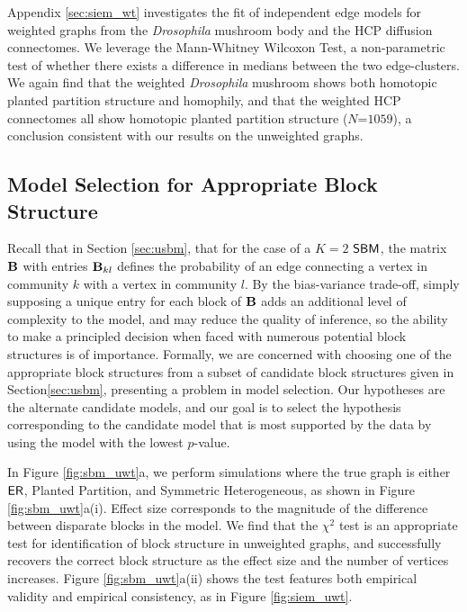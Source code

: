 Appendix \ref{sec:siem_wt} investigates the fit of independent edge models for weighted graphs from the \textit{Drosophila} mushroom body and the HCP diffusion connectomes. We leverage the Mann-Whitney Wilcoxon Test, a non-parametric test of whether there exists a difference in medians between the two edge-clusters. We again find that the weighted \textit{Drosophila} mushroom shows both homotopic planted partition structure and homophily, and that the weighted HCP connectomes all show homotopic planted partition structure ($N$=$1059$), a conclusion consistent with our results on the unweighted graphs. 

\subsection{Model Selection for Appropriate Block Structure}
\label{sec:sbm_block_est}

Recall that in Section \ref{sec:usbm}, that for the case of a $K=2$ $\operatorname{\mathsf{SBM}}$, the matrix $\operatorname{\mathbf{B}}$ with entries $\operatorname{\mathbf{B}}_{kl}$ defines the probability of an edge connecting a vertex in community $k$ with a vertex in community $l$. By the bias-variance trade-off, simply supposing a unique entry for each block of $\operatorname{\mathbf{B}}$ adds an additional level of complexity to the model, and may reduce the quality of inference, so the ability to make a principled decision when faced with numerous potential block structures is of importance. Formally, we are concerned with choosing one of the appropriate block structures from a subset of candidate block structures given in Section\ref{sec:usbm}, presenting a problem in model selection. Our hypotheses are the alternate candidate models, and our goal is to select the hypothesis corresponding to the candidate model that is most supported by the data by using the model with the lowest $p$-value.

In Figure \ref{fig:sbm_uwt}a, we perform simulations where the true graph is either $\operatorname{\mathsf{ER}}$, Planted Partition, and Symmetric Heterogeneous, as shown in Figure \ref{fig:sbm_uwt}a(i). Effect size corresponds to the magnitude of the difference between disparate blocks in the model. We find that the $\chi^2$ test 
is an appropriate test for identification of block structure in unweighted graphs, and successfully recovers the correct block structure as the effect size and the number of vertices increases. Figure \ref{fig:sbm_uwt}a(ii) shows the test features both empirical validity and empirical consistency, as in Figure \ref{fig:siem_uwt}. 

